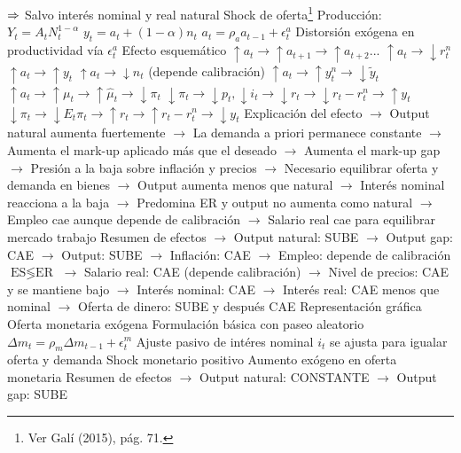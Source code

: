 \documentclass{nuevotema}
\begin{document}
\begin{esquemal}
				\4[] $\Rightarrow$ Salvo interés nominal y real natural
				\4[] 
				\4 Shock de oferta\footnote{Ver Galí (2015), pág. 71.}
				\4[] Producción:
				\4[] $Y_t = A_t N_t^{1-\alpha}$
				\4[] $y_t = a_t + (1-\alpha) n_t$
				\4[] $a_t = \rho_a a_{t-1} + \epsilon_t^a$
				\4[] Distorsión exógena en productividad vía $\epsilon_t^a$
				\4[] Efecto esquemático
				\4[] $\uparrow a_t \to \uparrow a_{t+1} \to \uparrow a_{t+2}...$
				\4[] $\uparrow a_t \to \downarrow r_t^n$
				\4[] $\uparrow a_t \to \uparrow y_t$
				\4[] $\uparrow a_t \to \downarrow n_t$ (depende calibración)
				\4[] $\uparrow a_t \to \uparrow y_t^n \to \downarrow \tilde{y}_t$
				\4[] $\uparrow a_t \to \uparrow \mu_t \to \uparrow \hat{\mu}_t \to \downarrow \pi_t$
				\4[] $\downarrow \pi_t \to \downarrow p_t, \downarrow i_t \to \downarrow r_t \to \downarrow r_t - r_t^n \to \uparrow y_t$
				\4[] $\downarrow \pi_t \to \downarrow E_t{\pi_t} \to \uparrow r_t \to \uparrow r_t - r_t^n \to \downarrow y_t$
				\4[] Explicación del efecto
				\4[] $\to$ Output natural aumenta fuertemente
				\4[] $\to$ La demanda a priori permanece constante
				\4[] $\to$ Aumenta el mark-up aplicado más que el deseado
				\4[] $\to$ Aumenta el mark-up gap
				\4[] $\to$ Presión a la baja sobre inflación y precios
				\4[] $\to$ Necesario equilibrar oferta y demanda en bienes
				\4[] $\to$ Output aumenta menos que natural
				\4[] $\to$ Interés nominal reacciona a la baja
				\4[] $\to$ Predomina ER y output no aumenta como natural
				\4[] $\to$ Empleo cae aunque depende de calibración
				\4[] $\to$ Salario real cae para equilibrar mercado trabajo
				\4[] Resumen de efectos
				\4[] $\to$ Output natural: SUBE
				\4[] $\to$ Output gap: CAE
				\4[] $\to$ Output: SUBE
				\4[] $\to$ Inflación: CAE
				\4[] $\to$ Empleo: depende de calibración $\text{ES} \lessgtr \text{ER}$
				\4[] $\to$ Salario real: CAE (depende calibración)
				\4[] $\to$ Nivel de precios: CAE y se mantiene bajo
				\4[] $\to$ Interés nominal: CAE
				\4[] $\to$ Interés real: CAE menos que nominal
				\4[] $\to$ Oferta de dinero: SUBE y después CAE
				\4[] Representación gráfica
				\4[] 
			\3 Oferta monetaria exógena
				\4 Formulación básica con paseo aleatorio
				\4[] $\Delta m_t = \rho_m \Delta m_{t-1} + \epsilon_t^m$
				\4 Ajuste pasivo de intéres nominal
				\4[] $i_t$ se ajusta para igualar oferta y demanda
				\4 Shock monetario positivo
				\4[] Aumento exógeno en oferta monetaria
				\4[] Resumen de efectos
				\4[] $\to$ Output natural: CONSTANTE
				\4[] $\to$ Output gap: SUBE

\end{esquemal}
\end{document}
